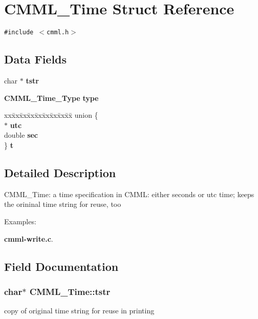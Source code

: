 \section{CMML\_\-Time Struct Reference}
\label{structCMML__Time}
{\tt \#include $<$cmml.h$>$}

\subsection*{Data Fields}
\begin{CompactItemize}
\item 
char $\ast$ {\bf tstr}
\item 
{\bf CMML\_\-Time\_\-Type} {\bf type}
\item 
\begin{tabbing}
xx\=xx\=xx\=xx\=xx\=xx\=xx\=xx\=xx\=\kill
union \{\\
 $\ast$ {\bf utc}\\
\>double {\bf sec}\\
\} {\bf t}\\

\end{tabbing}\end{CompactItemize}


\subsection{Detailed Description}
CMML\_\-Time: a time specification in CMML: either seconds or utc time; keeps the orininal time string for reuse, too \begin{Desc}
\item[Examples: ]\par


{\bf cmml-write.c}.\end{Desc}




\subsection{Field Documentation}
\subsubsection{\setlength{\rightskip}{0pt plus 5cm}char$\ast$ {\bf CMML\_\-Time::tstr}}\label{structCMML__Time_o0}


copy of original time string for reuse in printing 
